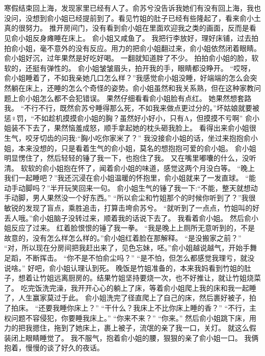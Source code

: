 \chapter{}
寒假结束回上海，发现家里已经有人了。俞苏兮没告诉我她们有没有回上海，我也没问，没想到俞小姐已经提前到了。看见竹姐的肚子已经有些隆起了，看来俞小土真的很努力。
推开房间门，没有看到俞小姐在里面欢迎我之类的画面，反而是看见俞小姐反身瘫睡在床上。
俞小姐又咸鱼了。
我把行李放好，理好床铺，过去拍拍俞小姐，毫不意外的没有反应。用力的把俞小姐翻过来，俞小姐依然闭着眼睛。
俞小姐好沉，过年果然是好吃好喝。
一翻就知道胖了不少。
拍拍俞小姐的脸，软软的，还挺有弹性的。
俞小姐皱皱眉头，拍开我的手，眼睛都没睁开。
“哎呀，俞小姐睡着了，不如我亲她几口怎么样？”我感觉俞小姐没睡，好端端的怎么会突然躺在床上，还睡的怎么个奇怪的姿势。俞小姐虽然和我关系熟，但在这种家教问题上俞小姐怎么都不会犯错误。
果然仔细看看俞小姐脸有点红。
她果然想套路我。
“不行不行，既然俞苏兮睡得那么死，不如我来做点更过分的。”坏姑娘就要被惩♀罚，“不如趁机摸摸俞小姐的胸？虽然好小好小，只有A，但摸摸不亏啊”
俞小姐装不下去了，果然恼羞成怒，顺手拿起她的枕头砸我脸上。
看得出来俞小姐很生气，咬牙切齿的问我:“胸小吃你家米了？”
我没接俞小姐的话，坐过来抱抱俞小姐，本来没想的，只是看着生气的俞小姐，莫名的想抱抱可爱的俞小姐。
俞小姐明显愣住了，然后轻轻的锤了我一下，也抱住了我。
又在嘴里嘟囔的什么，没听清。
软软的俞小姐抱在怀了，闻着俞小姐的味道，感觉这两个月没白等。
“晚上我们一起睡吧？”我还沉浸在俞小姐温暖的怀抱里，俞小姐就来了一发直球。
“能动手动脚吗？”半开玩笑回来一句。
俞小姐生气的锤了我一下:“不能，整天就想动手动脚，男人果然没一个好东西。”
“所以俞尘和竹姐那个的时候你听到了？”我很敏锐的发现了盲点，乘胜追击，打算击垮俞苏兮。
“就听到了一点点，竹姐叫的好丢人哦。”俞小姐脑子没转过来，顺着我的话说下去了。
我看着俞小姐。
然后俞小姐反应了过来。
红着脸恨恨的锤了我一拳。
“我是晚上上厕所无意听到的，不是故意的，没有怎么样怎么样的。”俞小姐红着脸在那解释。
“是没搬家之前？”
“对，所以现在分房间把我赶出来了，见色忘妹，呸。”俞小姐越说越气，开始手舞足蹈，不断挥击。
“你不是不怕俞尘吗？”
“是不怕，但怎么都感觉我理亏，就没说啥。”
好吧，俞小姐认理认到死。
晚饭是竹姐准备的，本来我妈看到竹姐的肚子，想着让竹姐远离厨房的。结果竹姐坚持要烧一次，也不好推让，就让竹姐烧菜了。
吃完饭洗完澡，我开开心心的躺上了床，等着俞小姐爬上我的床和我一起睡了，人生赢家莫过于此。
俞小姐洗完了径直爬上了自己的床，然后裹好被子，拍了拍床。
“还要我睡你床上？”
“干什么？我床上不比你床上睡的香？”
“不行，主权问题不容侵犯，你要睡我床上。”
“你来不来？”
“你来。”
然后俞小姐跳下床，用力的把我摁住，拖到了她床上，裹上被子，流氓的亲了我一口，关灯。
就这么假装闭上眼睛睡觉了。
我不服气，抱着俞小姐的腰，狠狠的亲了俞小姐一口。
我俩抱着，慢慢的谈了好久的夜话。

